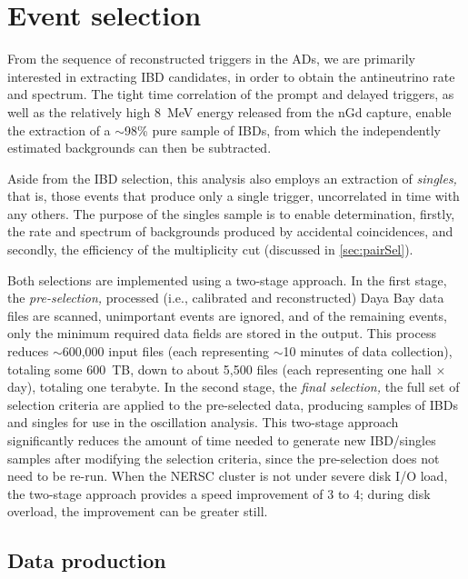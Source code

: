 \documentclass[../thesis.tex]{subfiles}
\begin{document}
\chapter{Event selection}
\label{chap:selection}


From the sequence of reconstructed triggers in the ADs, we are primarily interested in extracting IBD candidates, in order to obtain the antineutrino rate and spectrum. The tight time correlation of the prompt and delayed triggers, as well as the relatively high 8~MeV energy released from the nGd capture, enable the extraction of a $\sim$98\% pure sample of IBDs, from which the independently estimated backgrounds can then be subtracted.

Aside from the IBD selection, this analysis also employs an extraction of \emph{singles,} that is, those events that produce only a single trigger, uncorrelated in time with any others. The purpose of the singles sample is to enable determination, firstly, the rate and spectrum of backgrounds produced by accidental coincidences, and secondly, the efficiency of the multiplicity cut (discussed in \autoref{sec:pairSel}).

Both selections are implemented using a two-stage approach. In the first stage, the \emph{pre-selection,} processed (i.e., calibrated and reconstructed) Daya Bay data files are scanned, unimportant events are ignored, and of the remaining events, only the minimum required data fields are stored in the output. This process reduces $\sim$600,000 input files (each representing $\sim$10 minutes of data collection), totaling some 600~TB, down to about 5,500 files (each representing one hall $\times$ day), totaling one terabyte. In the second stage, the \emph{final selection,} the full set of selection criteria are applied to the pre-selected data, producing samples of IBDs and singles for use in the oscillation analysis. This two-stage approach significantly reduces the amount of time needed to generate new IBD/singles samples after modifying the selection criteria, since the pre-selection does not need to be re-run. When the NERSC cluster is not under severe disk I/O load, the two-stage approach provides a speed improvement of 3 to 4; during disk overload, the improvement can be greater still.

\section{Data production}
\label{sec:selProd}
\end{document}
